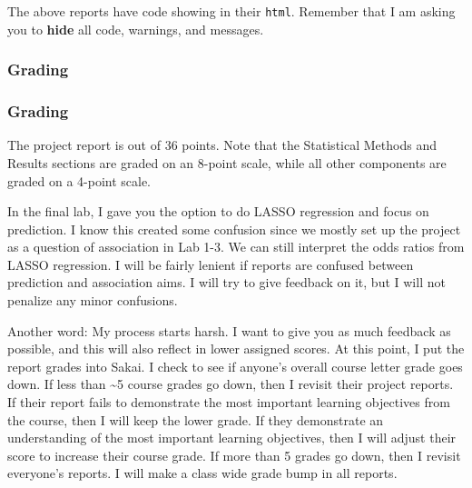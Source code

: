 \documentclass[
  letterpaper,
  DIV=11,
  numbers=noendperiod]{scrartcl}
\begin{document}
The above reports have code showing in their \texttt{html}. Remember
that I am asking you to \textbf{hide} all code, warnings, and messages.

\hypertarget{grading}{%
\subsubsection{Grading}\label{grading}}

\subsubsection{Grading}

The project report is out of 36 points. Note that the Statistical
Methods and Results sections are graded on an 8-point scale, while all
other components are graded on a 4-point scale.

\begin{tcolorbox}[enhanced jigsaw, toprule=.15mm, left=2mm, toptitle=1mm, leftrule=.75mm, arc=.35mm, colback=white, opacityback=0, coltitle=black, breakable, colframe=quarto-callout-important-color-frame, title=\textcolor{quarto-callout-important-color}{\faExclamation}\hspace{0.5em}{Some words on my grading process}, colbacktitle=quarto-callout-important-color!10!white, bottomrule=.15mm, opacitybacktitle=0.6, bottomtitle=1mm, rightrule=.15mm, titlerule=0mm]

In the final lab, I gave you the option to do LASSO regression and focus
on prediction. I know this created some confusion since we mostly set up
the project as a question of association in Lab 1-3. We can still
interpret the odds ratios from LASSO regression. I will be fairly
lenient if reports are confused between prediction and association aims.
I will try to give feedback on it, but I will not penalize any minor
confusions.

Another word: My process starts harsh. I want to give you as much
feedback as possible, and this will also reflect in lower assigned
scores. At this point, I put the report grades into Sakai. I check to
see if anyone's overall course letter grade goes down. If less than
\textasciitilde5 course grades go down, then I revisit their project
reports. If their report fails to demonstrate the most important
learning objectives from the course, then I will keep the lower grade.
If they demonstrate an understanding of the most important learning
objectives, then I will adjust their score to increase their course
grade. If more than 5 grades go down, then I revisit everyone's reports.
I will make a class wide grade bump in all reports.

\end{tcolorbox}
\end{document}
